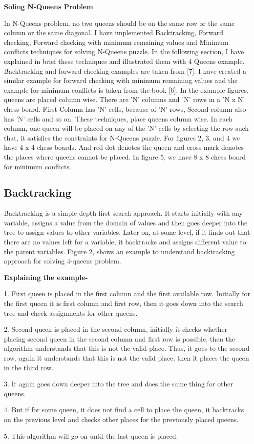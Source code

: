 \documentclass[conference]{IEEEtran}
\begin{document}
 
\textbf{Soling N-Queens Problem}
\par In N-Queens problem, no two queens should be on the same row or the same column or the same diagonal. I have implemented Backtracking, Forward checking, Forward checking with minimum remaining values and Minimum conflicts techniques for solving N-Queens puzzle. In the following section, I have explained in brief these techniques and illustrated them with 4 Queens example. Backtracking and forward checking examples are taken from [7]. I have created a similar example for forward checking with minimum remaining values and the example for minimum conflicts is taken from the book [6]. In the example figures, queens are placed column wise. There are 'N' columns and 'N' rows in a 'N x N' chess board. First Column has 'N' cells, because of 'N' rows, Second column also has 'N' cells and so on. These techniques, place queens column wise. In each column, one queen will be placed on any of the 'N' cells by selecting the row such that, it satisfies the constraints for N-Queens puzzle. For figures 2, 3, and 4 we have 4 x 4 chess boards. And red dot denotes the queen and cross mark denotes the places where queens cannot be placed. In figure 5, we have 8 x 8 chess board for minimum conflicts.

\subsection{Backtracking}
 Backtracking is a simple depth first search approach. It starts initially with any variable, assigns a value from the domain of values and then goes deeper into the tree to assign values to other variables. Later on, at some level, if it finds out that there are no values left for a variable, it backtracks and assigns different value to the parent variables. Figure 2, shows an example to understand backtracking approach for solving 4-queens problem.
 
 \textbf{Explaining the example- }

1. First queen is placed in the first column and the first available row. Initially for the first queen it is first column and first row, then it goes down into the search tree and check assignments for other queens.
\par 2. Second queen is placed in the second column, initially it checks whether placing second queen in the second column and first row is possible, then the algorithm understands that this is not the valid place. Thus, it goes to the second row, again it understands that this is not the valid place, then it places the queen in the third row.
\par 3. It again goes down deeper into the tree and does the same thing for other queens.
\par 4. But if for some queen, it does not find a cell to place the queen, it backtracks on the previous level and checks other places for the previously placed queens.
\par 5. This algorithm will go on until the last queen is placed.
\end{document}
